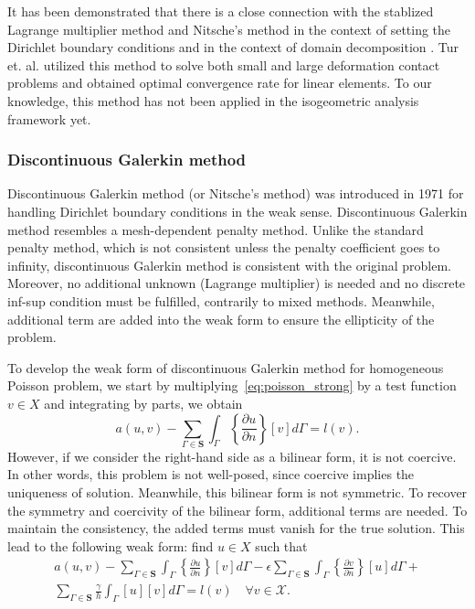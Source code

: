 \documentclass[preprint,12pt]{elsarticle}
\begin{document}
It has been demonstrated that there is a close connection with the stablized Lagrange multiplier method and Nitsche's method in the context of setting the Dirichlet boundary conditions \cite{stenberg1995some} and in the context of domain decomposition \cite{hansbo2005lagrange, hansbo_nitsches_2005, juntunen2015connection}. Tur et. al. \cite{tur2015modified} utilized this method to solve both small and large deformation contact problems and obtained optimal convergence rate for linear elements. To our knowledge, this method has not been applied in the isogeometric analysis framework yet.
\subsubsection{Discontinuous Galerkin method}
Discontinuous Galerkin method (or Nitsche's method) was introduced in 1971 \cite{nitsche_uber_1971} for handling Dirichlet boundary conditions in the weak sense. Discontinuous Galerkin method resembles a mesh-dependent penalty method. Unlike the standard penalty method, which is not consistent unless the penalty coefficient goes to infinity, discontinuous Galerkin method is consistent with the original problem. Moreover, no additional unknown (Lagrange multiplier) is needed and no discrete inf-sup condition must be fulfilled, contrarily to mixed methods. Meanwhile, additional term are added into the weak form to ensure the ellipticity of the problem.\par
To develop the weak form of discontinuous Galerkin method for homogeneous Poisson problem, we start by multiplying~\eqref{eq:poisson_strong} by a test function $v\in{X}$ and integrating by parts, we obtain
\begin{equation}
    a(u,v)-\sum_{\Gamma\in\mathbf{S}}\int_\Gamma\left\{\frac{\partial{u}}{\partial{n}}\right\}\left[v\right]d\Gamma=l(v).\label{eq:origin_discontinuous_galerkin}
\end{equation}
However, if we consider the right-hand side as a bilinear form, it is not coercive. In other words, this problem is not well-posed, since coercive implies the uniqueness of solution. Meanwhile, this bilinear form is not symmetric. To recover the symmetry and coercivity of the bilinear form, additional terms are needed. To maintain the consistency, the added terms must vanish for the true solution. This lead to the following weak form: find $u\in{X}$ such that
\begin{equation}
\begin{split}
    a(u,v)-\sum_{\Gamma\in\mathbf{S}}\int_\Gamma\left\{\frac{\partial{u}}{\partial{n}}\right\}\left[v\right]d\Gamma-\epsilon\sum_{\Gamma\in\mathbf{S}}\int_\Gamma\left\{\frac{\partial{v}}{\partial{n}}\right\}\left[u\right]d\Gamma+\\
    \sum_{\Gamma\in\mathbf{S}}\frac{\gamma}{h}\int_\Gamma\left[u\right]\left[v\right]d\Gamma=l(v)\quad \forall v\in{\mathcal{X}}.
\end{split}
\end{equation}
\end{document}

